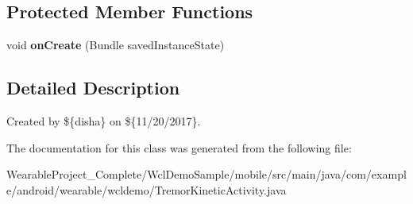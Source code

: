 \subsection*{Protected Member Functions}
\begin{DoxyCompactItemize}
\item 
void {\bfseries on\+Create} (Bundle saved\+Instance\+State)\hypertarget{classcom_1_1example_1_1android_1_1wearable_1_1wcldemo_1_1TremorKineticActivity_a2c61585006d34bdad4a252c74a5aee63}{}\label{classcom_1_1example_1_1android_1_1wearable_1_1wcldemo_1_1TremorKineticActivity_a2c61585006d34bdad4a252c74a5aee63}

\end{DoxyCompactItemize}


\subsection{Detailed Description}
Created by \$\{disha\} on \$\{11/20/2017\}. 

The documentation for this class was generated from the following file\+:\begin{DoxyCompactItemize}
\item 
Wearable\+Project\+\_\+\+Complete/\+Wcl\+Demo\+Sample/mobile/src/main/java/com/example/android/wearable/wcldemo/Tremor\+Kinetic\+Activity.\+java\end{DoxyCompactItemize}
